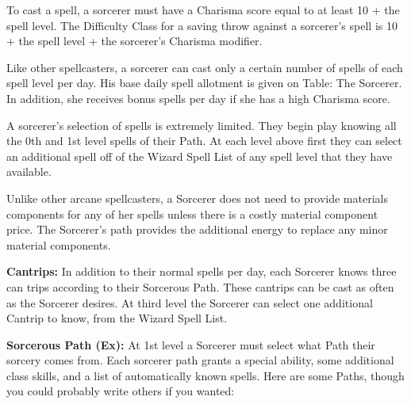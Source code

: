 To cast a spell, a sorcerer must have a Charisma score equal to at least 10 + the spell level. The Difficulty Class for a saving throw against a sorcerer's spell is 10 + the spell level + the sorcerer's Charisma modifier.

Like other spellcasters, a sorcerer can cast only a certain number of spells of each spell level per day. His base daily spell allotment is given on Table: The Sorcerer. In addition, she receives bonus spells per day if she has a high Charisma score.

A sorcerer's selection of spells is extremely limited. They begin play knowing all the 0th and 1st level spells of their Path. At each level above first they can select an additional spell off of the Wizard Spell List of any spell level that they have available.

Unlike other arcane spellcasters, a Sorcerer does not need to provide materials components for any of her spells unless there is a costly material component price. The Sorcerer's path provides the additional energy to replace any minor material components.

\textbf{Cantrips:} In addition to their normal spells per day, each Sorcerer knows three can trips according to their Sorcerous Path. These cantrips can be cast as often as the Sorcerer desires. At third level the Sorcerer can select one additional Cantrip to know, from the Wizard Spell List.

\textbf{Sorcerous Path (Ex):} At 1st level a Sorcerer must select what Path their sorcery comes from. Each sorcerer path grants a special ability, some additional class skills, and a list of automatically known spells. Here are some Paths, though you could probably write others if you wanted:


